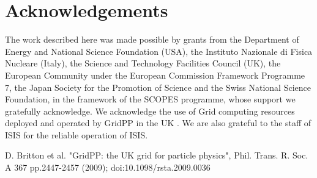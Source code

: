 \section{Acknowledgements}
\label{Sect:Acknowledgements}

The work described here was made possible by grants from the Department of Energy and National Science Foundation (USA), the Instituto Nazionale di Fisica Nucleare (Italy), 
the Science and Technology Facilities Council (UK), the European Community under the European Commission Framework Programme 7, the Japan Society for the Promotion of 
Science and the Swiss National Science Foundation, in the framework of the SCOPES programme, whose support we gratefully acknowledge. We acknowledge the use of Grid 
computing resources deployed and operated by GridPP in the UK \cite{grid_pp_2009}. We are also grateful to the staff of ISIS for the reliable operation of ISIS.

 D. Britton et al. "GridPP: the UK grid for particle physics", Phil. Trans. R. Soc. A 367 pp.2447-2457 (2009); doi:10.1098/rsta.2009.0036
